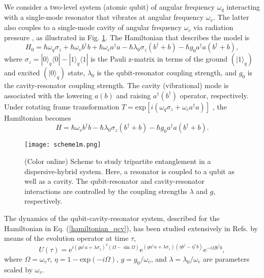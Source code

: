 We consider a two-level system (atomic qubit) of angular frequency $\omega_q$ interacting with a single-mode resonator that vibrates at angular frequency $\omega_v$. The latter also couples to a single-mode cavity of angular frequency $\omega_c$ via radiation pressure \cite{aspelmeyer2014cavity}, as illustrated in Fig. \ref{fig0}. The Hamiltonian  that describes the model is 
\begin{equation}
H_{0}=\hbar \omega_{q} \sigma_{z}+\hbar \omega_{v} b^{\dagger}b+\hbar \omega_{c} a^{\dagger}a-\hbar \lambda_{0} \sigma_{z} (b^{\dagger}+b)-\hbar g_{0} a^{\dagger}a (b^{\dagger}+b),
\end{equation}
where $\sigma_z=|0\rangle_{q}\langle 0|-|1\rangle_{q}\langle 1|$ is the Pauli z-matrix in terms of the ground $\left(|1\rangle_{q}\right)$ and excited $\left(|0\rangle_{q}\right)$ state, $\lambda_{0}$ is the qubit-resonator coupling strength, and $g_{0}$ is the cavity-resonator coupling strength. The cavity (vibrational) mode is associated with the lowering $a (b)$ and raising $a^{\dagger} (b^{\dagger})$ operator, respectively. Under rotating frame transformation $T=\textrm{exp}\left[i\left(\omega_{q}\sigma_{z}+\omega_{c}a^{\dagger}a\right)\right]$ \cite{montenegro2019mechanical}, the Hamiltonian becomes
\begin{equation}\label{hamiltonian_qcv}
H=\hbar \omega_{v} b^{\dagger}b-\hbar \lambda_{0} \sigma_{z} (b^{\dagger}+b)-\hbar g_{0} a^{\dagger}a (b^{\dagger}+b).
\end{equation}
\begin{figure}
	\centering
	\texttt{[image: scheme1m.png]}
	\caption{(Color online) Scheme to study tripartite entanglement in a dispersive-hybrid system. Here, a resonator is coupled to a qubit as well as a cavity. The qubit-resonator and cavity-resonator interactions are controlled by the coupling strengths $\lambda$ and $g$, respectively.}
	\label{fig0}
\end{figure}
The dynamics of the qubit-cavity-resonator system, described for the Hamiltonian in Eq. (\ref{hamiltonian_qcv}), has been studied extensively in Refs. \cite{bose1997preparation, mancini1997ponderomotive, montenegro2014nonlinearity} by means of the evolution operator at time $\tau$,
\begin{equation}\label{evolution_operator_qcv}
U(\tau)=\textrm{e}^{i(ga^{\dagger}a+\lambda \sigma_{z})^{2}(\Omega-\sin\Omega)}\textrm{e}^{(ga^{\dagger}a+\lambda \sigma_{z})(\eta b^{\dagger}-\eta^{*}b)}\textrm{e}^{-i \Omega b^{\dagger}b},
\end{equation}
where $\Omega=\omega_{v} \tau$, $\eta=1-\textrm{exp}\left(-i\Omega\right)$, $g=g_{0}/\omega_{v}$, and $\lambda=\lambda_{0}/\omega_{v}$ are parameters scaled by $\omega_{v}$.

